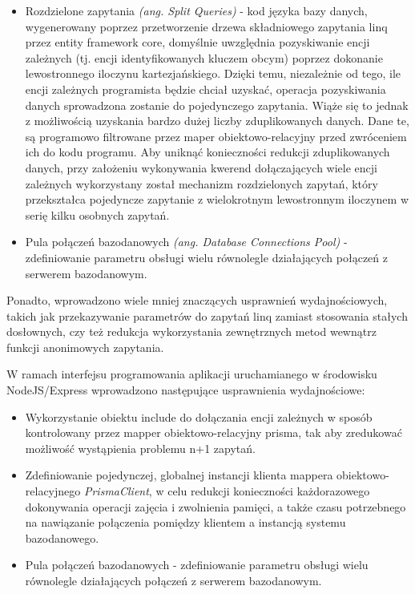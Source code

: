 \begin{itemize}
    \item Rozdzielone zapytania \textit{(ang. Split Queries)} - kod języka bazy danych, wygenerowany poprzez przetworzenie drzewa składniowego zapytania linq przez entity framework core, domyślnie uwzględnia pozyskiwanie encji zależnych (tj. encji identyfikowanych kluczem obcym) poprzez dokonanie lewostronnego iloczynu kartezjańskiego. Dzięki temu, niezależnie od tego, ile encji zależnych programista będzie chciał uzyskać, operacja pozyskiwania danych sprowadzona zostanie do pojedynczego zapytania. Wiąże się to jednak z możliwością uzyskania bardzo dużej liczby zduplikowanych danych. Dane te, są programowo filtrowane przez maper obiektowo-relacyjny przed zwróceniem ich do kodu programu. Aby uniknąć konieczności redukcji zduplikowanych danych, przy założeniu wykonywania kwerend dołączających wiele encji zależnych wykorzystany został mechanizm rozdzielonych zapytań, który przekształca pojedyncze zapytanie z wielokrotnym lewostronnym iloczynem w serię kilku osobnych zapytań.
    \item Pula połączeń bazodanowych \textit{(ang. Database Connections Pool)} - zdefiniowanie parametru obsługi wielu równolegle działających połączeń z serwerem bazodanowym. 
\end{itemize}

Ponadto, wprowadzono wiele mniej znaczących usprawnień wydajnościowych, takich jak przekazywanie parametrów do zapytań linq zamiast stosowania stałych dosłownych, czy też redukcja wykorzystania zewnętrznych metod wewnątrz funkcji anonimowych zapytania. 

W ramach interfejsu programowania aplikacji uruchamianego w środowisku NodeJS/Express wprowadzono następujące usprawnienia wydajnościowe:
\begin{itemize}
    \item Wykorzystanie obiektu include do dołączania encji zależnych w sposób kontrolowany przez mapper obiektowo-relacyjny prisma, tak aby zredukować możliwość wystąpienia problemu n+1 zapytań.
    \item Zdefiniowanie pojedynczej, globalnej instancji klienta mappera obiektowo-relacyjnego \textit{PrismaClient}, w celu redukcji konieczności każdorazowego dokonywania operacji zajęcia i zwolnienia pamięci, a także czasu potrzebnego na nawiązanie połączenia pomiędzy klientem a instancją systemu bazodanowego.
    \item Pula połączeń bazodanowych - zdefiniowanie parametru obsługi wielu równolegle działających połączeń z serwerem bazodanowym. 
\end{itemize}

